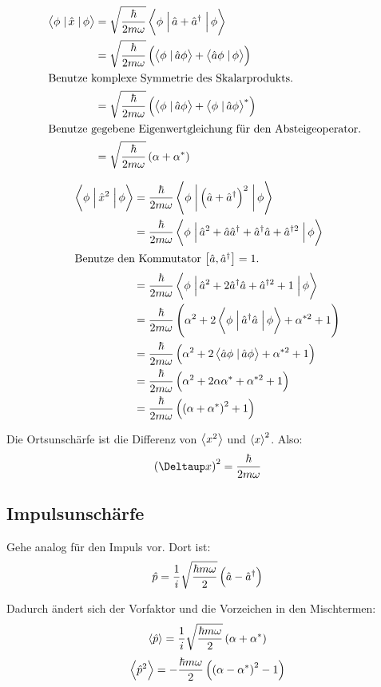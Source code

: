 \begin{align*}
	\braopket{\phi}{\hat x}{\phi}
	&= \sqrt{\frac{\hbar}{2m\omega}} \braopket\phi{\hat a + \hat a^\dagger}\phi \\
	&= \sqrt{\frac{\hbar}{2m\omega}} \del{\braket\phi{\hat a \phi} + \braket{\hat a\phi}\phi} \\
	\intertext{%
		Benutze komplexe Symmetrie des Skalarprodukts.
	}
	&= \sqrt{\frac{\hbar}{2m\omega}} \del{\braket\phi{\hat a \phi} + \braket{\phi}{\hat a\phi}^*} \\
	\intertext{%
		Benutze gegebene Eigenwertgleichung für den Absteigeoperator.
	}
	&= \sqrt{\frac{\hbar}{2m\omega}} \del{\alpha + \alpha^*}
\end{align*}

\begin{align*}
	\braopket{\phi}{\hat x^2}{\phi}
	&= \frac{\hbar}{2m\omega} \braopket\phi{\del{\hat a + \hat a^\dagger}^2}\phi \\
	&= \frac{\hbar}{2m\omega} \braopket\phi{\hat a^2 + \hat a \hat a^\dagger + \hat a^\dagger \hat a + \hat a^{\dagger2}}\phi \\
	\intertext{%
		Benutze den Kommutator $\sbr{\hat a, \hat a^\dagger} = 1$.
	}
	&= \frac{\hbar}{2m\omega} \braopket\phi{\hat a^2 + 2\hat a^\dagger \hat a + \hat a^{\dagger2} + 1}\phi \\
	&= \frac{\hbar}{2m\omega} \del{\alpha^2 + 2\braopket\phi{\hat a^\dagger \hat a}\phi + \alpha^{*2} + 1} \\
	&= \frac{\hbar}{2m\omega} \del{\alpha^2 + 2\braket{\hat a\phi}{\hat a\phi} + \alpha^{*2} + 1} \\
	&= \frac{\hbar}{2m\omega} \del{\alpha^2 + 2 \alpha \alpha^* + \alpha^{*2} + 1} \\
	&= \frac{\hbar}{2m\omega} \del{\del{\alpha+ \alpha^*}^2 + 1}
\end{align*}

Die Ortsunschärfe ist die Differenz von $\left\langle x^2 \right\rangle$ und $\left\langle x \right\rangle^2$. Also:
\[
	\del{\Deltaup x}^2 = \frac{\hbar}{2m\omega} 
\]

\subsection{Impulsunschärfe}

Gehe analog für den Impuls vor. Dort ist:
\[
	\hat p = \frac 1i \sqrt{\frac{\hbar m \omega}{2}} \del{\hat a - \hat a^\dagger}
\]

Dadurch ändert sich der Vorfaktor und die Vorzeichen in den Mischtermen:
\[
	\bracket{\hat p} =  \frac 1i \sqrt{\frac{\hbar m \omega}{2}} \del{\alpha + \alpha^*}
\]
\[
	\bracket{\hat p^2} = - \frac{\hbar m \omega}{2} \del{\del{\alpha - \alpha^*}^2 - 1}
\]

